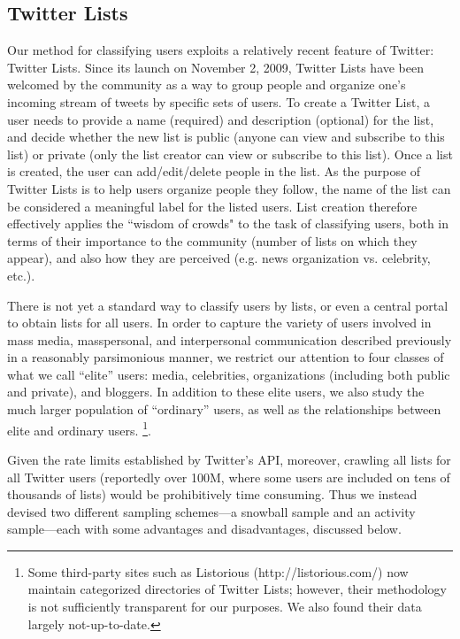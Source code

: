 \documentclass[phd,tocprelim]{cornell}
\begin{document}
\subsection{Twitter Lists}
\label{sec:classify}
Our method for classifying users exploits a relatively recent feature of
Twitter: Twitter Lists. Since its launch on November 2, 2009, Twitter Lists
have been welcomed by the community as a way to group people and organize
one's incoming stream of tweets by specific sets of users. To create a
Twitter List, a user needs to provide a name (required) and description
(optional) for the list, and decide whether the new list is public (anyone
can view and subscribe to this list) or private (only the list creator can
view or subscribe to this list). Once a list is created, the user can
add/edit/delete people in the list. As the purpose of Twitter Lists is to
help users organize people they follow, the name of the list can be
considered a meaningful label for the listed users.  List creation
therefore effectively applies the ``wisdom of crowds" to the task of
classifying users, both in terms of their importance to the community
(number of lists on which they appear), and also how they are perceived
(e.g. news organization vs. celebrity, etc.).


There is not yet a standard way to classify users by lists, or even a
central portal to obtain lists for all users. In order to capture the
variety of users involved in mass media, masspersonal, and interpersonal
communication described previously in a reasonably
parsimonious manner, we restrict our attention to four classes of what we
call ``elite'' users: media, celebrities, organizations (including both
public and private), and bloggers. In addition to these elite users, we
also study the much larger population of ``ordinary'' users, as well as the
relationships between elite and ordinary users.
 \footnote{Some
 third-party sites such as Listorious (http://listorious.com/) now
 maintain categorized directories of Twitter Lists; however, their
 methodology is not sufficiently transparent for our
 purposes. We also found their data largely not-up-to-date.}. 


Given the rate limits established by Twitter's API, moreover, crawling all
lists for all Twitter users (reportedly over 100M, where some users are
included on tens of thousands of lists) would be prohibitively time
consuming. Thus we instead devised two different sampling schemes---a
snowball sample and an activity sample---each with some advantages and
disadvantages, discussed below.
\end{document}
